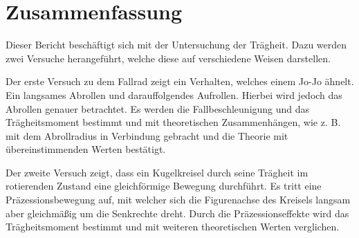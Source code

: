 
\section{Zusammenfassung}


Dieser Bericht beschäftigt sich mit der Untersuchung der Trägheit. Dazu werden zwei Versuche herangeführt, welche diese auf verschiedene Weisen darstellen.

Der erste Versuch zu dem Fallrad zeigt ein Verhalten, welches einem Jo-Jo ähnelt. Ein langsames Abrollen und darauffolgendes Aufrollen. Hierbei wird jedoch das Abrollen genauer betrachtet. Es werden die Fallbeschleunigung und das Trägheitsmoment bestimmt und mit theoretischen Zusammenhängen, wie z. B. mit dem Abrollradius in Verbindung gebracht und die Theorie mit übereinstimmenden Werten bestätigt.

Der zweite Versuch zeigt, dass ein Kugelkreisel durch seine Trägheit im rotierenden Zustand eine gleichförmige Bewegung durchführt.
Es tritt eine Präzessionsbewegung auf, mit welcher sich die Figurenachse des Kreisels langsam aber gleichmäßig um die Senkrechte dreht.
Durch die Präzessionseffekte wird das Trägheitsmoment bestimmt und mit weiteren theoretischen Werten verglichen.
